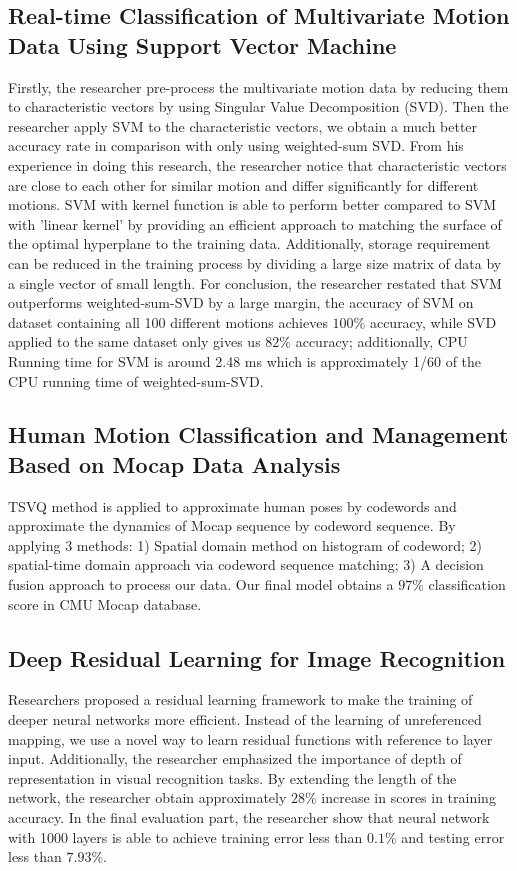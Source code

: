 \documentclass[letterpaper, 10pt, conference]{ieeeconf}
\begin{document}
\subsection{Real-time Classification of Multivariate Motion Data Using Support Vector Machine}
Firstly, the researcher pre-process the multivariate motion data by reducing them to characteristic vectors by using Singular Value Decomposition (SVD). Then the researcher apply SVM to the characteristic vectors, we obtain a much better accuracy rate in comparison with only using weighted-sum SVD. From his experience in doing this research, the researcher notice that characteristic vectors are close to each other for similar motion and differ significantly for different motions. SVM with kernel function is able to perform better compared to SVM with 'linear kernel' by providing an efficient approach to matching the surface of the optimal hyperplane to the training data. Additionally, storage requirement can be reduced in the training process by dividing a large size matrix of data by a single vector of small length. For conclusion, the researcher restated that SVM outperforms weighted-sum-SVD by a large margin, the accuracy of SVM on dataset containing all 100 different motions achieves $100\%$ accuracy, while SVD applied to the same dataset only gives us $82\%$ accuracy; additionally, CPU Running time for SVM is around 2.48 ms which is approximately 1/60 of the CPU running time of weighted-sum-SVD. 

\subsection{Human Motion Classification and Management Based on Mocap Data Analysis}
TSVQ method is applied to approximate human poses by codewords and approximate the dynamics of Mocap sequence by codeword sequence. By applying 3 methods: 1) Spatial domain method on histogram of codeword; 2) spatial-time domain approach via codeword sequence matching; 3) A decision fusion approach to process our data. Our final model obtains a $97\%$ classification score in CMU Mocap database. 

\subsection{Deep Residual Learning for Image Recognition}
Researchers proposed a residual learning framework to make the training of deeper neural networks more efficient. Instead of the learning of unreferenced mapping, we use a novel way to learn residual functions with reference to layer input. Additionally, the researcher emphasized the importance of depth of representation in visual recognition tasks. By extending the length of the network, the researcher obtain approximately $28\%$ increase in scores in training accuracy. In the final evaluation part, the researcher show that neural network with 1000 layers is able to achieve training error less than $0.1\%$ and testing error less than $7.93\%$. \\
\end{document}
